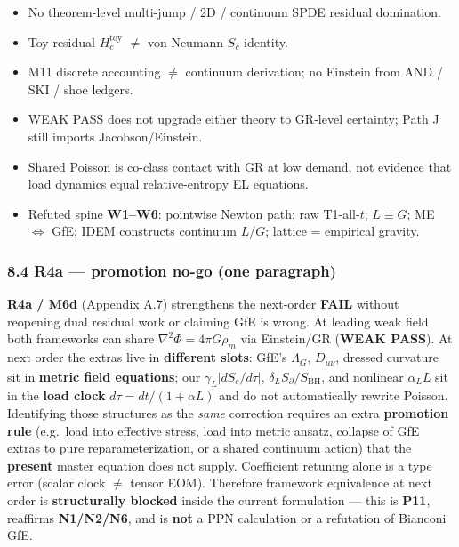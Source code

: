 \documentclass[
  11pt,
]{article}
\providecommand{\tightlist}{%
  \setlength{\itemsep}{0pt}\setlength{\parskip}{0pt}}
\begin{document}
\begin{itemize}
\tightlist
\item
  No theorem-level multi-jump / 2D / continuum SPDE residual domination.\\
\item
  Toy residual \(H_c^{\mathrm{toy}}\) \(\neq\) von Neumann \(S_c\) identity.\\
\item
  M11 discrete accounting \(\neq\) continuum derivation; no Einstein from AND / SKI / shoe ledgers.\\
\item
  WEAK PASS does not upgrade either theory to GR-level certainty; Path J still imports Jacobson/Einstein.\\
\item
  Shared Poisson is co-class contact with GR at low demand, not evidence that load dynamics equal relative-entropy EL equations.\\
\item
  Refuted spine \textbf{W1--W6}: pointwise Newton path; raw T1-all-\(t\); \(L\equiv G\); ME \(\Leftrightarrow\) GfE; IDEM constructs continuum \(L\)/\(G\); lattice = empirical gravity.
\end{itemize}

\subsubsection{8.4 R4a --- promotion no-go (one paragraph)}\label{r4a-promotion-no-go-one-paragraph}

\textbf{R4a / M6d} (Appendix A.7) strengthens the next-order \textbf{FAIL} without reopening dual residual work or claiming GfE is wrong. At leading weak field both frameworks can share \(\nabla^2\Phi=4\pi G\rho_m\) via Einstein/GR (\textbf{WEAK PASS}). At next order the extras live in \textbf{different slots}: GfE's \(\Lambda_G\), \(D_{\mu\nu}\), dressed curvature sit in \textbf{metric field equations}; our \(\gamma_L|dS_c/d\tau|\), \(\delta_L S_{\partial}/S_{\mathrm{BH}}\), and nonlinear \(\alpha_L L\) sit in the \textbf{load clock} \(d\tau=dt/(1+\alpha L)\) and do not automatically rewrite Poisson. Identifying those structures as the \emph{same} correction requires an extra \textbf{promotion rule} (e.g.~load into effective stress, load into metric ansatz, collapse of GfE extras to pure reparameterization, or a shared continuum action) that the \textbf{present} master equation does not supply. Coefficient retuning alone is a type error (scalar clock \(\neq\) tensor EOM). Therefore framework equivalence at next order is \textbf{structurally blocked} inside the current formulation --- this is \textbf{P11}, reaffirms \textbf{N1/N2/N6}, and is \textbf{not} a PPN calculation or a refutation of Bianconi GfE.
\end{document}
